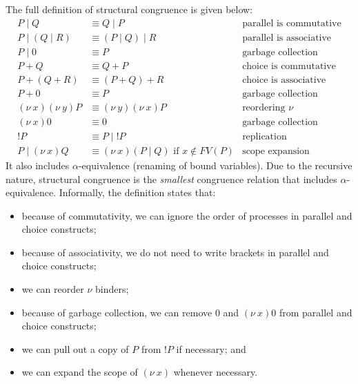 \documentclass[a4paper, openany]{memoir}
\theoremstyle{definition}
\begin{document}
    The full definition of structural congruence is given below:
    \begin{align*}
        P \mid Q &\equiv Q \mid P & \textrm{parallel is commutative} \\
        P \mid (Q \mid R) &\equiv (P \mid Q) \mid R & \textrm{parallel is associative} \\
        P \mid 0 &\equiv P & \textrm{garbage collection} \\
        P + Q &\equiv Q + P & \textrm{choice is commutative} \\
        P + (Q + R) &\equiv (P + Q) + R & \textrm{choice is associative} \\
        P + 0 &\equiv P & \textrm{garbage collection} \\
        (\nu \ x)(\nu \ y)P &\equiv (\nu \ y)(\nu \ x)P & \textrm{reordering } \nu \\
        (\nu \ x)0 &\equiv 0 & \textrm{garbage collection} \\
        !P &\equiv P \mid !P & \textrm{replication} \\
        P \mid (\nu \ x) Q &\equiv (\nu \ x)(P \mid Q) \textrm{ if } x \not\in FV(P) & \textrm{scope expansion}
    \end{align*}
    It also includes $\alpha$-equivalence (renaming of bound variables). Due to the recursive nature, structural congruence is the \emph{smallest} congruence relation that includes $\alpha$-equivalence. Informally, the definition states that:
    \begin{itemize}
        \item because of commutativity, we can ignore the order of processes in parallel and choice constructs;
        \item because of associativity, we do not need to write brackets in parallel and choice constructs;
        \item we can reorder $\nu$ binders;
        \item because of garbage collection, we can remove $0$ and $(\nu \  x) 0$ from parallel and choice constructs;
        \item we can pull out a copy of $P$ from $!P$ if necessary; and
        \item we can expand the scope of $(\nu \ x)$ whenever necessary.
    \end{itemize}
\end{document}
